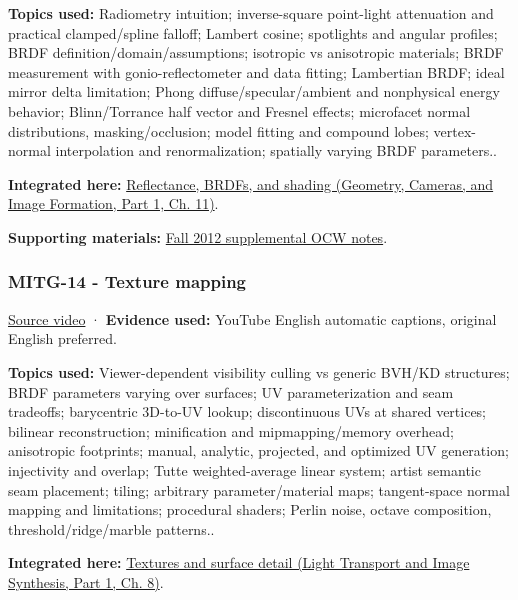 \textbf{Topics used:} Radiometry intuition; inverse-square point-light attenuation and practical clamped/spline falloff; Lambert cosine; spotlights and angular profiles; BRDF definition/domain/assumptions; isotropic vs anisotropic materials; BRDF measurement with gonio-reflectometer and data fitting; Lambertian BRDF; ideal mirror delta limitation; Phong diffuse/specular/ambient and nonphysical energy behavior; Blinn/Torrance half vector and Fresnel effects; microfacet normal distributions, masking/occlusion; model fitting and compound lobes; vertex-normal interpolation and renormalization; spatially varying BRDF parameters..

\textbf{Integrated here:} \href{../03-Geometry-Cameras-and-Image-Formation-P01/main.pdf\#03-visual-computing-i-ch004-reflectance-brdfs-and-shading}{Reflectance, BRDFs, and shading (Geometry, Cameras, and Image Formation, Part 1, Ch. 11)}.

\textbf{Supporting materials:} \href{https://ocw.mit.edu/courses/6-837-computer-graphics-fall-2012/pages/lecture-notes/}{Fall 2012 supplemental OCW notes}.

\subsubsection{MITG-14 - Texture mapping}\label{04-visual-computing-ii-ch036-mitg-14---texture-mapping}

\hypertarget{04-visual-computing-ii-ch036-mitg-14---texture-mapping}{}

\href{https://www.youtube.com/watch?v=TQTciMjuxrY}{Source video} · \textbf{Evidence used:} YouTube English automatic captions, original English preferred.

\textbf{Topics used:} Viewer-dependent visibility culling vs generic BVH/KD structures; BRDF parameters varying over surfaces; UV parameterization and seam tradeoffs; barycentric 3D-to-UV lookup; discontinuous UVs at shared vertices; bilinear reconstruction; minification and mipmapping/memory overhead; anisotropic footprints; manual, analytic, projected, and optimized UV generation; injectivity and overlap; Tutte weighted-average linear system; artist semantic seam placement; tiling; arbitrary parameter/material maps; tangent-space normal mapping and limitations; procedural shaders; Perlin noise, octave composition, threshold/ridge/marble patterns..

\textbf{Integrated here:} \href{../04-Light-Transport-and-Image-Synthesis-P01/main.pdf\#03-visual-computing-i-ch019-textures-and-surface-detail}{Textures and surface detail (Light Transport and Image Synthesis, Part 1, Ch. 8)}.

